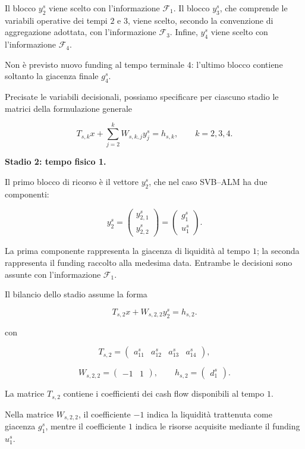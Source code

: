 Il blocco $y_2^s$ viene scelto con
l'informazione $\mathcal F_1$.
Il blocco $y_3^s$, che comprende
le variabili operative dei tempi $2$ e $3$,
viene scelto, secondo la convenzione
di aggregazione adottata, con
l'informazione $\mathcal F_3$.
Infine, $y_4^s$ viene scelto
con l'informazione $\mathcal F_4$.

Non \`e previsto nuovo funding al tempo
terminale $4$: l'ultimo blocco contiene
soltanto la giacenza finale $g_4^s$.

Precisate le variabili decisionali,
possiamo specificare per ciascuno stadio
le matrici della formulazione generale

\[
T_{s,k}x+
\sum_{j=2}^{k}W_{s,k,j}y_j^s
=
h_{s,k},
\qquad k=2,3,4.
\]

\medskip

\noindent
\textbf{Stadio 2: tempo fisico 1.}

Il primo blocco di ricorso \`e il vettore
$y_2^s$, che nel caso SVB--ALM ha due componenti:

\[
y_2^s
=
\begin{pmatrix}
y_{2,1}^s\\
y_{2,2}^s
\end{pmatrix}
=
\begin{pmatrix}
g_1^s\\
u_1^s
\end{pmatrix}.
\]

La prima componente rappresenta la giacenza
di liquidit\`a al tempo $1$; la seconda
rappresenta il funding raccolto alla medesima
data. Entrambe le decisioni sono assunte
con l'informazione $\mathcal F_1$.

Il bilancio dello stadio assume la forma

\[
T_{s,2}x+W_{s,2,2}y_2^s=h_{s,2}.
\]

\noindent con

\[
T_{s,2}
=
\begin{pmatrix}
a_{11}^s&a_{12}^s&a_{13}^s&a_{14}^s
\end{pmatrix},
\]

\[
W_{s,2,2}
=
\begin{pmatrix}
-1&1
\end{pmatrix},
\qquad
h_{s,2}=
\begin{pmatrix}
d_1^s
\end{pmatrix}.
\]

La matrice $T_{s,2}$ contiene
i coefficienti dei cash flow disponibili
al tempo $1$.

Nella matrice $W_{s,2,2}$,
il coefficiente $-1$ indica
la liquidit\`a trattenuta come giacenza
$g_1^s$, mentre il coefficiente $1$
indica le risorse acquisite mediante
il funding $u_1^s$.

